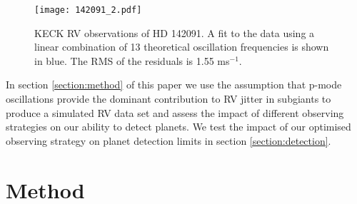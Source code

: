 \documentclass[useAMS, usenatbib]{aastex}
\begin{document}
\begin{figure*}
\begin{center}
\texttt{[image: 142091\_2.pdf]}
\caption{KECK RV observations of HD 142091. A fit to the data using a linear
combination of 13 theoretical oscillation frequencies is shown in blue. The RMS
of the residuals is 1.55 ms$^{-1}$.}
\label{fig:k2_2}
\end{center}
\end{figure*}

In section \textsection \ref{section:method} of this paper we use the
assumption that p-mode oscillations provide the dominant contribution to RV
jitter in subgiants to produce a simulated RV data set and assess the impact
of different observing strategies on our ability to detect planets.
We test the impact of our optimised observing strategy on planet detection
limits in section \textsection \ref{section:detection}.


\section{Method}
\label{method}
\end{document}
